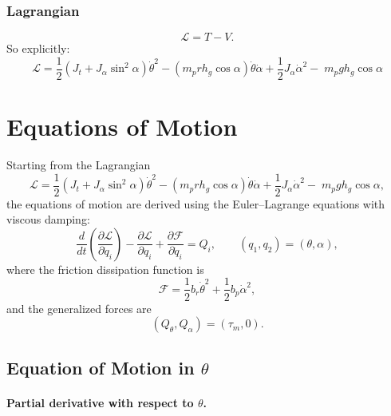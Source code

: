 \documentclass[12pt,a4paper]{article}
\begin{document}
\subsubsection{Lagrangian}

\[
\mathcal{L}=T-V.
\]
So explicitly:
\begin{equation}
\boxed{
\mathcal{L}
=
\frac{1}{2}\left(J_t+J_\alpha\sin^2\alpha\right)\dot\theta^2
-\left(m_p r h_g\cos\alpha\right)\dot\theta\dot\alpha
+\frac{1}{2}J_\alpha\dot\alpha^2
-\;m_p g h_g\cos\alpha
}
\label{eq:lagrangain}
\end{equation}

\section{Equations of Motion}

Starting from the Lagrangian
\begin{equation}
\mathcal{L}
=
\frac{1}{2}\left(J_t+J_\alpha\sin^2\alpha\right)\dot\theta^2
-\left(m_p r h_g\cos\alpha\right)\dot\theta\dot\alpha
+\frac{1}{2}J_\alpha\dot\alpha^2
-\;m_p g h_g\cos\alpha,
\label{eq:lagrangian}
\end{equation}
the equations of motion are derived using the Euler--Lagrange equations with viscous damping:
\begin{equation}
\frac{d}{dt}\left(\frac{\partial\mathcal{L}}{\partial\dot q_i}\right)
-\frac{\partial\mathcal{L}}{\partial q_i}
+\frac{\partial\mathcal{F}}{\partial\dot q_i}
=Q_i,
\qquad
(q_1,q_2)=(\theta,\alpha),
\label{eq:eulerlagrange}
\end{equation}
where the friction dissipation function is
\begin{equation}
\mathcal{F}=\frac{1}{2}b_r\dot\theta^2+\frac{1}{2}b_p\dot\alpha^2,
\label{eq:dissipation}
\end{equation}
and the generalized forces are
\[
(Q_\theta,Q_\alpha)=(\tau_m,0).
\]

\subsection{Equation of Motion in $\theta$}

\paragraph{Partial derivative with respect to $\theta$.}
\end{document}
